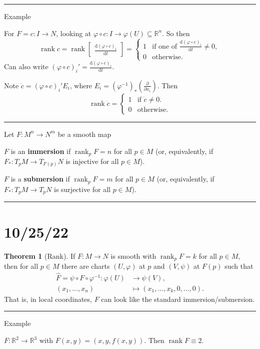 \documentclass[12pt]{article}
\newcommand{\keyword}[1]{\textbf{#1}}
\newcommand{\sepline}{\rule{\textwidth}{0.4pt}}
\theoremstyle{definition}
\newtheorem{theorem}{Theorem}
\newcommand{\R}{\mathbb{R}}
\renewcommand{\phi}{\varphi}
\newcommand{\<}{\left\langle}
\renewcommand{\>}{\right\rangle}
\newcommand{\seq}{\subseteq}
\newcommand{\To}{\longrightarrow}
\newcommand{\Mapsto}{\longmapsto}
\newcommand{\dd}{\mathrm{d}}
\DeclareMathOperator{\rank}{rank}
\newcommand{\pdv}[2]{\frac{\partial #1}{\partial #2}}
\newcommand{\odv}[2]{\frac{\dd #1}{\dd #2}}
\newcommand{\mat}[1]{\begin{bmatrix}#1\end{bmatrix}}
\renewcommand{\hat}{\widehat}
\begin{document}
\sepline

Example

For $F = c : I \to N$, looking at $\phi \circ c : I \to \phi(U) \seq \R^n$.
So then
\[
    \rank c
        = \rank\mat{\odv{(\phi \circ c)_i}{t}}
        = \begin{cases}
            1 &\text{if one of } \odv{(\phi \circ c)_i}{t} \ne 0, \\
            0 &\text{otherwise}.
        \end{cases}
\]
Can also write $(\phi \circ c)_i' = \odv{(\phi \circ c)_i}{t}$.

Note $\dot{c} = (\phi \circ c)_i'E_i$, where $E_i = (\phi^{-1})_*(\pdv{}{x_i})$.
Then
\[
    \rank\dot{c} = \begin{cases}
        1 &\text{if } \dot{c} \ne 0. \\
        0 &\text{otherwise}.
    \end{cases}
\]

\sepline

Let $F: M^n \to N^m$ be a smooth map

$F$ is an \keyword{immersion} if $\rank_pF = n$ for all $p \in M$
(or, equivalently, if $F_* : T_pM \to T_{F(p)}N$ is injective for all $p \in M$).

$F$ is a \keyword{submersion} if $\rank_pF = m$ for all $p \in M$ (or, equivalently, if $F_* : T_pM \to T_pN$ is surjective for all $p \in M$).

\sepline

\section*{10/25/22}


\begin{theorem}[Rank]
    If $F : M \to N$ is smooth with $\rank_p F = k$ for all $p \in M$, then for all $p \in M$ there are charts $(U, \phi)$ at $p$ and $(V, \psi)$ at $F(p)$ such that
    \begin{align*}
        \hat{F} = \psi \circ F \circ \phi^{-1} : \phi(U) &\To \psi(V), \\
            (x_1, \dots, x_n) &\Mapsto (x_1, \dots, x_k, 0, \dots, 0).
    \end{align*}
    That is, in local coordinates, $F$ can look like the standard immersion/submersion.
\end{theorem}

\sepline

Example

$F : \R^2 \to \R^3$ with $F(x, y) = (x, y, f(x, y))$.
Then $\rank F \equiv 2$.
\end{document}

